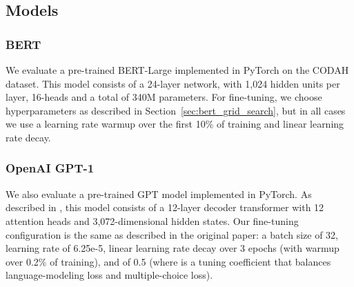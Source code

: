 \documentclass[11pt,a4paper]{article}
\begin{document}
    \subsection{Models}
    \subsubsection{BERT}
    We evaluate a pre-trained BERT-Large \cite{devlin2018bert} implemented in PyTorch on the CODAH dataset. This model consists of a 24-layer network, with 1,024 hidden units per layer, 16-heads and a total of 340M parameters. For fine-tuning, we choose hyperparameters as described in Section~\ref{sec:bert_grid_search}, but in all cases we use a learning rate warmup over the first 10\% of training and linear learning rate decay.
    
    \subsubsection{OpenAI GPT-1}
    We also evaluate a pre-trained GPT model implemented in PyTorch. As described in , this model consists of a 12-layer decoder transformer with 12 attention heads and 3,072-dimensional hidden states. Our fine-tuning configuration is the same as described in the original paper: a batch size of 32, learning rate of 6.25e-5, linear learning rate decay over 3 epochs (with warmup over 0.2\% of training), and  of 0.5 (where  is a tuning coefficient that balances language-modeling loss and multiple-choice loss).
\end{document}
